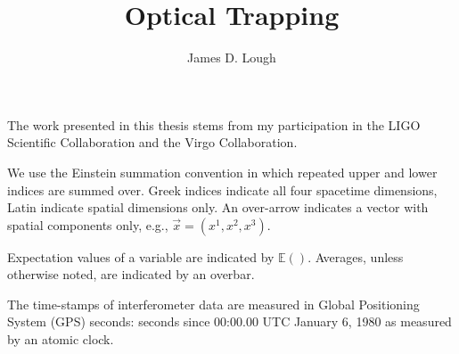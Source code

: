 \documentclass[12pt,notitlepage]{report}
\begin{document}

\title{
Optical Trapping
}
\author{James D. Lough}

\havededicationtrue
\dedication{to\\my little scientists,\\Elizabeth and Henry}
\haveminorfalse
\copyrighttrue
\doctoratetrue
\figurespagetrue
\tablespagetrue
\signedtitlepfalse

\beforepreface {}

The work presented in this thesis stems from my participation in the LIGO
Scientific Collaboration and the Virgo Collaboration.


We use the Einstein summation convention in which repeated upper and lower
indices are summed over. Greek indices indicate all four spacetime dimensions,
Latin indicate spatial dimensions only. An over-arrow indicates a vector with
spatial components only, e.g., $\vec{x} = (x^1,x^2,x^3)$.

\vspace{0.5cm}

\noindent Expectation values of a variable are indicated by $\mathbb{E}()$.
Averages, unless otherwise noted, are indicated by an overbar.

\vspace{0.5cm}

\noindent The time-stamps of interferometer data are measured in
Global Positioning System (GPS) seconds: seconds since 00:00.00 UTC
January 6, 1980 as measured by an atomic clock.



\afterpreface

\label{ch:introduction}


\label{ch:opspringstab}


\label{ch:angletrap}


\label{ch:psl}

\end{document}

